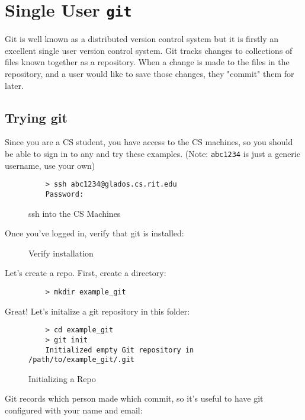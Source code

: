 \documentclass[11pt]{report}
\begin{document}
\chapter{Single User \texttt{git}}
Git is well known as a distributed version control system but it is
firstly an excellent single user version control system. 
Git tracks changes to collections of files known together as a repository.
When a change is made to the files in the repository, and a user would like
to save those changes, they "commit" them for later.

\section{Trying git}
Since you are a CS student,
you have access to the CS machines, so you should be able to sign in to any and
try these examples. (Note: \texttt{abc1234} is just a generic username, use your own)

\begin{figure}[H]
  \caption{ssh into the CS Machines}
  \begin{lstlisting}
    > ssh abc1234@glados.cs.rit.edu
    Password:
  \end{lstlisting}
\end{figure}

Once you've logged in, verify that git is installed:

\begin{figure}[H]\end{figure}
\begin{figure}[H]\caption{Verify installation}\end{figure}

Let's create a repo. First, create a directory:
\begin{figure}[H]
  \begin{lstlisting}
    > mkdir example_git
  \end{lstlisting}
\end{figure}

Great! Let's initalize a git repository in this folder:
\begin{figure}[H]
  \caption{Initializing a Repo}
  \begin{lstlisting}
    > cd example_git
    > git init
    Initialized empty Git repository in /path/to/example_git/.git
  \end{lstlisting}
\end{figure}

Git records which person made which commit, so it's useful to have git
configured with your name and email:
\end{document}
